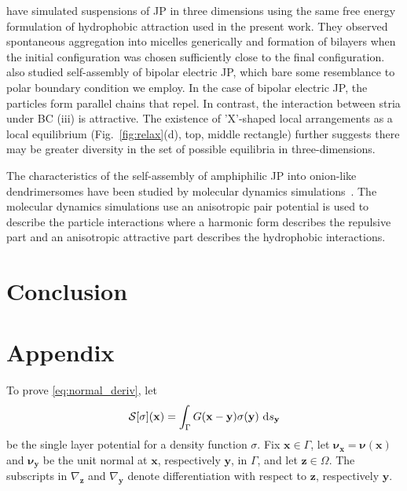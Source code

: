 \documentclass[prb,preprint,showpacs,preprintnumbers,amsmath,amssymb,longbibliography]{revtex4-1}
\newcommand{\nnu}{\boldsymbol{\nu}}
\newcommand{\xx}{\mathbf{x}}
\newcommand{\zz}{\mathbf{z}}
\newcommand{\yy}{\mathbf{y}}
\begin{document}
\citet{kohl-cor-che-vee22} have simulated
suspensions of JP in three dimensions
using the same free energy formulation of
hydrophobic attraction used in the
present work. They observed spontaneous
aggregation into micelles generically and
formation of bilayers when the initial
configuration was chosen sufficiently close to the final
configuration.
\citet{kohl-cor-che-vee22} also studied self-assembly
of bipolar electric JP, which bare some resemblance
to polar boundary condition we employ.
In the case of bipolar electric JP, the particles
form parallel chains that repel.  In contrast, the
interaction between stria under BC (iii) is attractive.
The existence of 'X'-shaped local arrangements as a local
equilibrium (Fig.~\ref{fig:relax}(d), top, middle rectangle)
further suggests there may be greater diversity in the set of
possible equilibria in three-dimensions.

The characteristics of the self-assembly of amphiphilic JP into onion-like
dendrimersomes have been studied
by molecular dynamics simulations~\cite{C9NR05885K}.  
The molecular dynamics simulations
use an anisotropic pair potential
is used to describe the particle interactions
where a harmonic form describes the repulsive part 
and an anisotropic attractive part describes the hydrophobic interactions.
\section{Conclusion}

\label{sec:conclusion}

\section{Appendix}
\label{sec:appendix}
To prove \eqref{eq:normal_deriv}, let 
\begin{equation}
  \label{eq:SLP}
  \mathcal{S}[\sigma](\xx) = \int_\Gamma G(\xx-\yy) \sigma(\yy)\, \dif s_\yy
\end{equation}
be the single layer potential for a density function $\sigma.$
Fix $\xx \in \Gamma$,
let $\nnu_{\xx} = \nnu(\xx)$ and $\nnu_{\yy}$ be the unit normal at $\xx$, respectively $\yy$, in $\Gamma$,
and let $\zz \in \Omega$.  The subscripts in $\nabla_{\zz}$ and $\nabla_{\yy}$ denote
differentiation with respect to $\zz$, respectively $\yy$.
\end{document}
